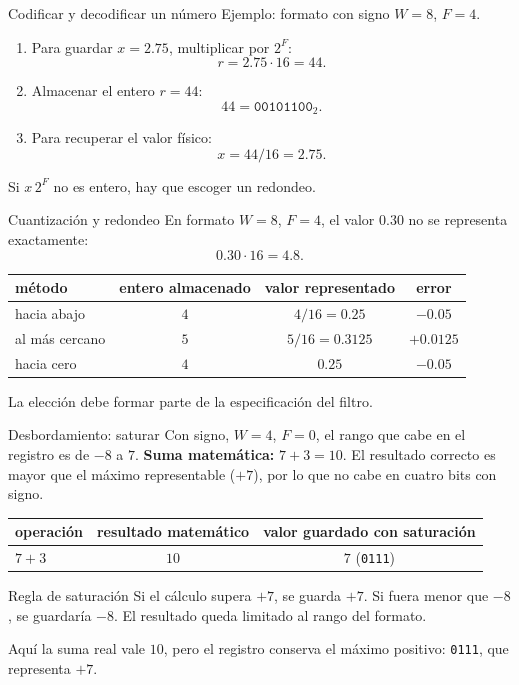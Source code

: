 \documentclass[aspectratio=169,10pt]{beamer}
\begin{document}
\begin{frame}{Codificar y decodificar un número}
  Ejemplo: formato con signo $W=8$, $F=4$.
  \begin{enumerate}
    \item Para guardar $x=2.75$, multiplicar por $2^F$:
      \[r=2.75\cdot 16=44.\]
    \item Almacenar el entero $r=44$:
      \[44=\texttt{00101100}_2.\]
    \item Para recuperar el valor físico:
      \[x=44/16=2.75.\]
  \end{enumerate}
  Si $x\,2^F$ no es entero, hay que escoger un redondeo.
\end{frame}

\begin{frame}{Cuantización y redondeo}
  En formato $W=8$, $F=4$, el valor $0.30$ no se representa exactamente:
  \[
    0.30\cdot 16=4.8.
  \]
  \begin{center}
  \begin{tabular}{lccc}
  \toprule
  método & entero almacenado & valor representado & error\\ \midrule
  hacia abajo & $4$ & $4/16=0.25$ & $-0.05$\\
  al más cercano & $5$ & $5/16=0.3125$ & $+0.0125$\\
  hacia cero & $4$ & $0.25$ & $-0.05$\\
  \bottomrule
  \end{tabular}
  \end{center}
  La elección debe formar parte de la especificación del filtro.
\end{frame}

\begin{frame}{Desbordamiento: saturar}
  Con signo, $W=4$, $F=0$, el rango que cabe en el registro es de $-8$ a $7$.
  \vspace{2mm}
  \textbf{Suma matemática:} $7+3=10$. El resultado correcto es mayor que el
  máximo representable ($+7$), por lo que no cabe en cuatro bits con signo.
  \begin{center}
  \begin{tabular}{lcc}
  \toprule
  operación & resultado matemático & valor guardado con saturación\\ \midrule
  $7+3$ & $10$ & $7$ (\texttt{0111})\\
  \bottomrule
  \end{tabular}
  \end{center}
  \begin{block}{Regla de saturación}
    Si el cálculo supera $+7$, se guarda $+7$. Si fuera menor que $-8$, se
    guardaría $-8$. El resultado queda limitado al rango del formato.
  \end{block}
  Aquí la suma real vale $10$, pero el registro conserva el máximo positivo:
  \texttt{0111}, que representa $+7$.
\end{frame}
\end{document}
